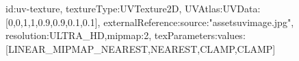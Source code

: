 {id:uv-texture,
textureType:UVTexture2D,
UVAtlas:{UVData:[0,0,1,1,0.9,0.9,0.1,0.1]},
externalReference:{source:"assets\/uvimage.jpg"},
resolution:ULTRA_HD,mipmap:2,
texParameters:{values:[LINEAR_MIPMAP_NEAREST,NEAREST,CLAMP,CLAMP]}}